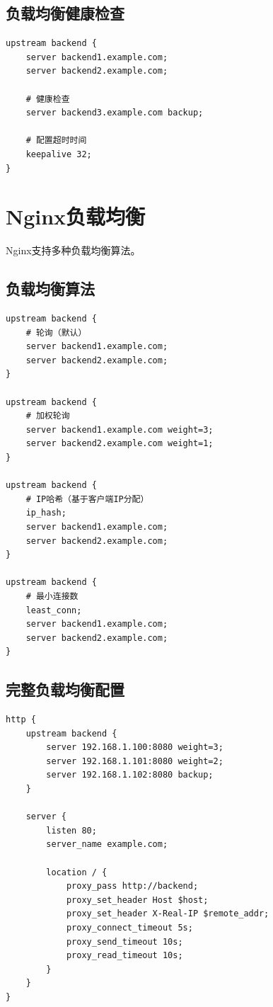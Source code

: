 \documentclass[12pt,UTF8]{ctexbook}
\begin{document}
\subsection*{负载均衡健康检查}
\begin{lstlisting}
upstream backend {
    server backend1.example.com;
    server backend2.example.com;
    
    # 健康检查
    server backend3.example.com backup;
    
    # 配置超时时间
    keepalive 32;
}
\end{lstlisting}

\section{Nginx负载均衡}
\label{sec:nginx-lb}

Nginx支持多种负载均衡算法。

\subsection*{负载均衡算法}
\begin{lstlisting}
upstream backend {
    # 轮询（默认）
    server backend1.example.com;
    server backend2.example.com;
}

upstream backend {
    # 加权轮询
    server backend1.example.com weight=3;
    server backend2.example.com weight=1;
}

upstream backend {
    # IP哈希（基于客户端IP分配）
    ip_hash;
    server backend1.example.com;
    server backend2.example.com;
}

upstream backend {
    # 最小连接数
    least_conn;
    server backend1.example.com;
    server backend2.example.com;
}
\end{lstlisting}

\subsection*{完整负载均衡配置}
\begin{lstlisting}
http {
    upstream backend {
        server 192.168.1.100:8080 weight=3;
        server 192.168.1.101:8080 weight=2;
        server 192.168.1.102:8080 backup;
    }
    
    server {
        listen 80;
        server_name example.com;
        
        location / {
            proxy_pass http://backend;
            proxy_set_header Host $host;
            proxy_set_header X-Real-IP $remote_addr;
            proxy_connect_timeout 5s;
            proxy_send_timeout 10s;
            proxy_read_timeout 10s;
        }
    }
}
\end{lstlisting}
\end{document}
